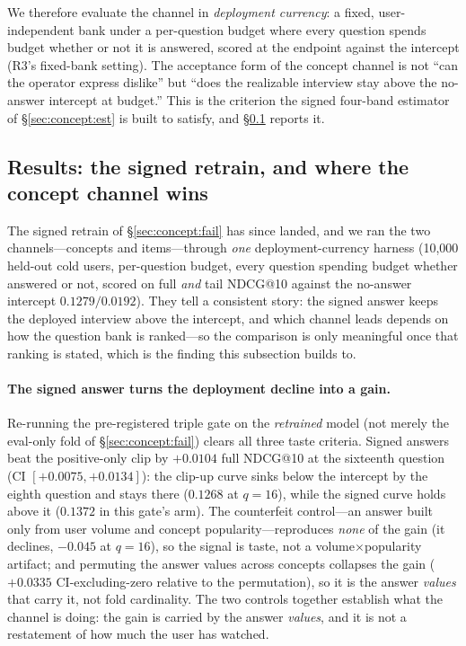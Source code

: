 \documentclass[11pt]{article}
\begin{document}
We therefore evaluate the channel in \emph{deployment currency}: a fixed, user-independent bank under a
per-question budget where every question spends budget whether or not it is answered, scored at the
endpoint against the intercept (R3's fixed-bank setting). The acceptance form of the concept
channel is not ``can the operator express dislike'' but ``does the realizable interview stay above the
no-answer intercept at budget.'' This is the criterion the signed four-band estimator of
\S\ref{sec:concept:est} is built to satisfy, and \S\ref{sec:concept:results} reports it.

\subsection{Results: the signed retrain, and where the concept channel wins}\label{sec:concept:results}

The signed retrain of \S\ref{sec:concept:fail} has since landed, and we ran the two channels---concepts and
items---through \emph{one} deployment-currency harness (10{,}000 held-out cold users, per-question budget, every
question spending budget whether answered or not, scored on full \emph{and} tail NDCG@10 against the no-answer
intercept $0.1279/0.0192$). They tell a consistent story: the signed answer keeps the deployed interview
above the intercept, and which channel leads depends on how the question bank is ranked---so the comparison
is only meaningful once that ranking is stated, which is the finding this subsection builds to.

\paragraph{The signed answer turns the deployment decline into a gain.} Re-running the pre-registered triple gate on
the \emph{retrained} model (not merely the eval-only fold of \S\ref{sec:concept:fail}) clears all three taste
criteria. Signed answers beat the positive-only clip by $+0.0104$ full NDCG@10 at the sixteenth question (CI
$[+0.0075,+0.0134]$): the clip-up curve sinks below the intercept by the eighth question and stays there ($0.1268$ at
$q{=}16$), while the signed curve holds above it ($0.1372$ in this gate's arm). The counterfeit control---an answer built only from user
volume and concept popularity---reproduces \emph{none} of the gain (it declines, $-0.045$ at $q{=}16$), so the signal
is taste, not a volume$\times$popularity artifact; and permuting the answer values across concepts collapses the gain
($+0.0335$ CI-excluding-zero relative to the permutation), so it is the answer \emph{values} that carry it, not fold
cardinality. The two controls together establish what the channel is doing: the gain is carried by the answer
\emph{values}, and it is not a restatement of how much the user has watched.
\end{document}
